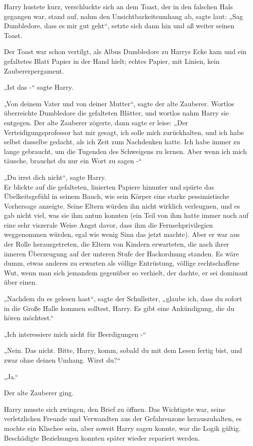 {Harry hustete kurz, verschluckte sich an dem Toast, der in den falschen Hals gegangen war, stand auf, nahm den Unsichtbarkeitsumhang ab, sagte laut: „Sag Dumbledore, dass es mir gut geht“, setzte sich dann hin und aß weiter seinen Toast.

Der Toast war schon vertilgt, als Albus Dumbledore zu Harrys Ecke kam und ein gefaltetes Blatt Papier in der Hand hielt; echtes Papier, mit Linien, kein Zaubererpergament.

„Ist das -“ sagte Harry.

„Von deinem Vater und von deiner Mutter“, sagte der alte Zauberer. Wortlos überreichte Dumbledore die gefalteten Blätter, und wortlos nahm Harry sie entgegen. Der alte Zauberer zögerte, dann sagte er leise: „Der Verteidigungsprofessor hat mir gesagt, ich solle mich zurückhalten, und ich habe selbst dasselbe gedacht, als ich Zeit zum Nachdenken hatte. Ich habe immer zu lange gebraucht, um die Tugenden des Schweigens zu lernen. Aber wenn ich mich täusche, brauchst du nur ein Wort zu sagen -“

„Du irrst dich nicht“, sagte Harry.\\ Er blickte auf die gefalteten, linierten Papiere hinunter und spürte das Übelkeitsgefühl in seinem Bauch, wie sein Körper eine starke pessimistische Vorhersage anzeigte. Seine Eltern würden ihn nicht wirklich verleugnen, und es gab nicht viel, was sie ihm antun konnten (ein Teil von ihm hatte immer noch auf eine sehr viszerale Weise Angst davor, dass ihm die Fernsehprivilegien weggenommen würden, egal wie wenig Sinn das jetzt machte). Aber er war aus der Rolle herausgetreten, die Eltern von Kindern erwarteten, die nach ihrer inneren Überzeugung auf der unteren Stufe der Hackordnung standen. Es wäre dumm, etwas anderes zu erwarten als völlige Entrüstung, völlige rechtschaffene Wut, wenn man sich jemandem gegenüber so verhielt, der dachte, er sei dominant über einen.

„Nachdem du es gelesen hast“, sagte der Schulleiter, „glaube ich, dass du sofort in die Große Halle kommen solltest, Harry. Es gibt eine Ankündigung, die du hören möchtest.“

„Ich interessiere mich nicht für Beerdigungen -“

„Nein. Das nicht. Bitte, Harry, komm, sobald du mit dem Lesen fertig bist, und zwar ohne deinen Umhang. Wirst du?“

„Ja.“

Der alte Zauberer ging.

Harry musste sich zwingen, den Brief zu öffnen. Das Wichtigste war, seine verletzlichen Freunde und Verwandten aus der Gefahrenzone herauszuhalten, es mochte ein Klischee sein, aber soweit Harry sagen konnte, war die Logik gültig. Beschädigte Beziehungen konnten später wieder repariert werden.

}
